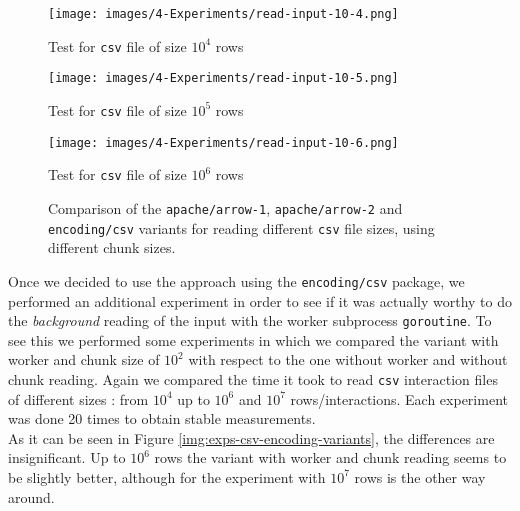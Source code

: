 \begin{figure}[H]
  \centering
  \begin{minipage}{0.48\textwidth}
    \centering
    \texttt{[image: images/4-Experiments/read-input-10-4.png]}
    \caption*{Test for \texttt{csv} file of size $10^4$ rows}
  \end{minipage}
  \hfill
  \begin{minipage}{0.48\textwidth}
    \centering
    \texttt{[image: images/4-Experiments/read-input-10-5.png]}
    \caption*{Test for \texttt{csv} file of size $10^5$ rows}
  \end{minipage}
  
  \vspace{0.5cm} %

  \begin{minipage}{0.6\textwidth}
    \centering
    \texttt{[image: images/4-Experiments/read-input-10-6.png]}
    \caption*{Test for \texttt{csv} file of size $10^6$ rows}
  \end{minipage}
  \caption{Comparison of the \texttt{apache/arrow-1}, \texttt{apache/arrow-2} and \texttt{encoding/csv} variants for reading different \texttt{csv} file sizes, using different chunk sizes.}
  \label{img:exps-read-input-variants}
\end{figure}

Once we decided to use the approach using the \texttt{encoding/csv} package, we performed an additional experiment in order to see if it was actually worthy to do the \emph{background} reading of the input with the worker subprocess \texttt{goroutine}. To see this we performed some experiments in which we compared the variant with worker and chunk size of $10^2$ with respect to the one without worker and without chunk reading. Again we compared the time it took to read \texttt{csv} interaction files of different sizes : from $10^4$ up to $10^6$ and $10^7$ rows/interactions. Each experiment was done 20 times to obtain stable measurements.\\

As it can be seen in Figure \ref{img:exps-csv-encoding-variants}, the differences are insignificant. Up to $10^6$ rows the variant with worker and chunk reading seems to be slightly better, although for the experiment with $10^7$ rows is the other way around.

